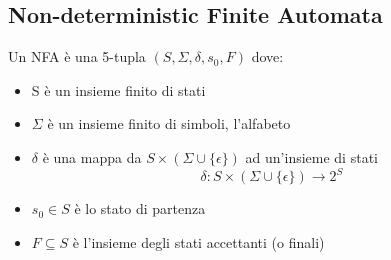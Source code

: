 \subsection{Non-deterministic Finite Automata}
\begin{definition}
Un NFA è una 5-tupla $(S,\Sigma,\delta,s_0,F)$ dove:
\begin{itemize}
\item S è un insieme finito di stati
\item $\Sigma$ è un insieme finito di simboli, l'alfabeto
\item $\delta$ è una mappa da $S \times (\Sigma \cup \{\epsilon\})$ ad
un'insieme di stati
$$\delta : S \times (\Sigma \cup \{\epsilon\}) \to 2^S$$
\item $s_0 \in S$ è lo stato di partenza
\item $F \subseteq S$ è l'insieme degli stati accettanti (o finali)
\end{itemize}
\end{definition}
